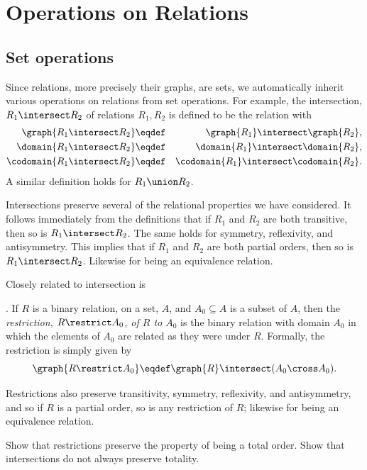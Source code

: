 \section{Operations on Relations}

\subsection{Set operations}
Since relations, more precisely their graphs, are sets, we automatically
inherit various operations on relations from set operations.  For example, 
the intersection, $R_1 \intersect R_2$ of relations $R_1, R_2$ is defined
to be the relation with
\begin{eqnarray*}
\graph{R_1 \intersect R_2} &\eqdef& \graph{R_1} \intersect \graph{R_2},\\
\domain{R_1 \intersect R_2} &\eqdef& \domain{R_1} \intersect
\domain{R_2},\\ \codomain{R_1 \intersect R_2} &\eqdef& \codomain{R_1}
\intersect \codomain{R_2}.
\end{eqnarray*}
A similar definition holds for $R_1 \union R_2$.

Intersections preserve several of the relational properties we have
considered.  It follows immediately from the definitions that if $R_1$ and
$R_2$ are both transitive, then so is $R_1 \intersect R_2$.  The same
holds for symmetry, reflexivity, and antisymmetry.  This implies that if
$R_1$ and $R_2$ are both partial orders, then so is $R_1 \intersect R_2$.
Likewise for being an equivalence relation.

Closely related to intersection is .  If $R$ is a binary relation, on a set, $A$,
and $A_0 \subseteq A$ is a subset of $A$, then the \emph{restriction, $R
\restrict A_0$, of $R$ to $A_0$} is the binary relation with domain $A_0$
in which the elements of $A_0$ are related as they were under $R$.
Formally, the restriction is simply given by
\[
\graph{R \restrict A_0} \eqdef \graph{R} \intersect (A_0 \cross A_0).
\]

Restrictions also preserve transitivity, symmetry, reflexivity, and
antisymmetry, and so if $R$ is a partial order, so is any restriction of
$R$; likewise for being an equivalence relation.

\begin{problem}
Show that restrictions preserve the property of being a total order.  Show
that intersections do not always preserve totality.
\end{problem}

